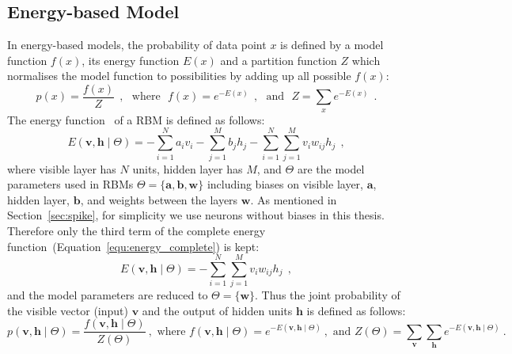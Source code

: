 \subsection{Energy-based Model}
In energy-based models, the probability of data point $x$ is defined by a model function $f(x)$, its energy function $E(x)$ and a partition function $Z$ which normalises the model function to possibilities by adding up all possible $f(x)$:
\begin{equation}
 p(x) = \dfrac{f(x)}{Z}~~, \textrm{~~where~~} f(x) =e^{-E(x)}~~,  \textrm{~~and~~}
 Z = \sum_{x} e^{-E(x)}~~.
\end{equation} 
The energy function~\cite{hopfield1982neural} of a RBM is defined as follows:
\begin{equation}
E(\mathbf{v}, \mathbf{h} \mid \Theta)= -\sum_{i=1}^N a_i v_i - \sum_{j=1}^M b_j h_j - \sum_{i=1}^N \sum_{j=1}^M v_i w_{ij} h_j~~,
\label{equ:energy_complete}
\end{equation}
where visible layer has $ N $ units, hidden layer has $ M $, and $ \Theta$ are the model parameters used in RBMs $ \Theta =\{\mathbf{a}, \mathbf{b}, \mathbf{w}\} $ including biases on visible layer, $\mathbf{a}$, hidden layer, $\mathbf{b}$, and weights between the layers $\mathbf{w}$.
As mentioned in Section~\ref{sec:spike}, for simplicity we use neurons without biases in this thesis.
Therefore only the third term of the complete energy function~(Equation~\ref{equ:energy_complete}) is kept:
\begin{equation}
E(\mathbf{v}, \mathbf{h} \mid \Theta)= - \sum_{i=1}^N \sum_{j=1}^M v_i w_{ij} h_j~~,
\label{equ:rbm_energy}
\end{equation}
and the model parameters are reduced to  $ \Theta = \{\mathbf{w}\} $.
Thus the joint probability of the visible vector (input) $\mathbf{v}$ and the output of hidden units $\mathbf{h}$ is defined as follows: 
\begin{equation}
p(\mathbf{v}, \mathbf{h} \mid \Theta) =\frac{f(\mathbf{v}, \mathbf{h} \mid \Theta)}{Z(\Theta)}~,  \textrm{~where~} 
f(\mathbf{v}, \mathbf{h} \mid \Theta) =e^{-E(\mathbf{v}, \mathbf{h} \mid \Theta)}~,  \textrm{~and~} 
Z(\Theta) = \sum_{\mathbf{v}} \sum_{\mathbf{h}} e^{-E(\mathbf{v}, \mathbf{h} \mid \Theta)}~.
\label{equ:rbm_prob}
\end{equation}


